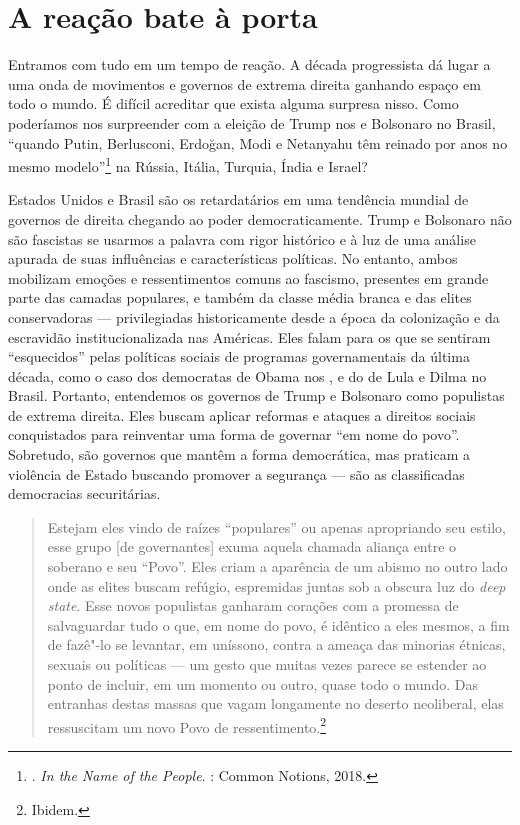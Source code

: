 


\section{A reação bate à porta}

Entramos com tudo em um tempo de reação. A década progressista dá lugar a uma onda de movimentos e governos de extrema direita ganhando espaço em todo o mundo. É difícil acreditar que exista alguma surpresa nisso. Como poderíamos nos surpreender com a eleição de Trump nos  e Bolsonaro no Brasil, ``quando Putin, Berlusconi, Erdoğan, Modi e Netanyahu têm reinado por anos no mesmo modelo''\footnote{. \emph{In the Name of the People}. : Common Notions, 2018.} na Rússia, Itália, Turquia, Índia e Israel?

Estados Unidos e Brasil são os retardatários em uma tendência mundial de governos de direita chegando ao poder democraticamente. Trump e Bolsonaro não são fascistas se usarmos a palavra com rigor histórico e à luz de uma análise apurada de suas influências e características políticas. No entanto, ambos mobilizam emoções e ressentimentos comuns ao fascismo, presentes em grande parte das camadas populares, e também da classe média branca e das elites conservadoras --- privilegiadas historicamente desde a época da colonização e da escravidão institucionalizada nas Américas. Eles falam para os que se sentiram ``esquecidos'' pelas políticas sociais de programas governamentais da última década, como o caso dos democratas de Obama nos , e do  de Lula e Dilma no Brasil. Portanto, entendemos os governos de Trump e Bolsonaro como populistas de extrema direita. Eles buscam aplicar reformas e ataques a direitos sociais conquistados para reinventar uma forma de governar ``em nome do povo''. Sobretudo, são governos que mantêm a forma democrática, mas praticam a violência de Estado buscando promover a segurança --- são as classificadas democracias securitárias.

\begin{quote}
Estejam eles vindo de raízes ``populares'' ou apenas apropriando seu estilo, esse grupo [de governantes] exuma aquela chamada aliança entre o soberano e seu ``Povo''. Eles criam a aparência de um abismo no outro lado onde as elites buscam refúgio, espremidas juntas sob a obscura luz do \emph{deep state}. Esse novos populistas ganharam corações com a promessa de salvaguardar tudo o que, em nome do povo, é idêntico a eles mesmos, a fim de fazê"-lo se levantar, em uníssono, contra a ameaça das minorias étnicas, sexuais ou políticas --- um gesto que muitas vezes parece se estender ao ponto de incluir, em um momento ou outro, quase todo o mundo. Das entranhas destas massas que vagam longamente no deserto neoliberal, elas ressuscitam um novo Povo de ressentimento.\footnote{Ibidem.}
\end{quote}

